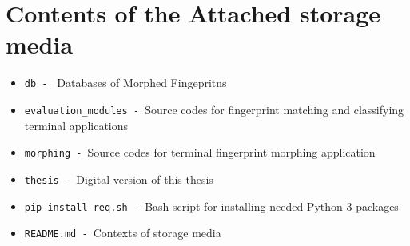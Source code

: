 \chapter{Contents of the Attached storage media}
\begin{itemize}
	\item \texttt{db - } Databases of Morphed Fingepritns
	\item \texttt{evaluation\_modules - }Source codes for fingerprint matching and classifying terminal applications
	\item \texttt{morphing - }Source codes for terminal fingerprint morphing application
	\item \texttt{thesis - }Digital version of this thesis
	\item \texttt{pip-install-req.sh - }Bash script for installing needed Python 3 packages
	\item \texttt{README.md - }Contexts of storage media
\end{itemize}